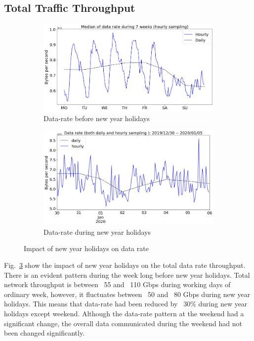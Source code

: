 \documentclass[10pt, journal, letterpaper]{IEEEtran}
\newcommand\linearFigSze{0.48}
\begin{document}
\subsection{Total Traffic Throughput}
\begin{figure}
    \begin{subfigure}{\linearFigSze\textwidth}
          \centering
          \includegraphics[width=\columnwidth]{img/BCH_byterate.png}
          \caption{Data-rate before new year holidays}
          \label{fig:BCH_bps}
    \end{subfigure}
    \begin{subfigure}{\linearFigSze\textwidth}
          \centering
          \includegraphics[width=\columnwidth]{img/CH2_byterate.png}
          \caption{Data-rate during new year holidays}
          \label{fig:CH_bps}
    \end{subfigure}
    \caption{Impact of new year holidays on data rate}
    \label{fig:datarate_BCH_CH}
\end{figure}
Fig.~\ref{fig:datarate_BCH_CH} show the impact of new year holidays on the total data rate throughput. There is an evident pattern during the week long before new year holidays. Total network throughput is between ~55 and ~110 Gbps during working days of ordinary week, however, it fluctuates between ~50 and ~80 Gbps during new year holidays. This means that data-rate had been reduced by ~30$\%$ during new year holidays except weekend. Although the data-rate pattern at the weekend had a significant change, the overall data communicated during the weekend had not been changed significantly.
\end{document}
